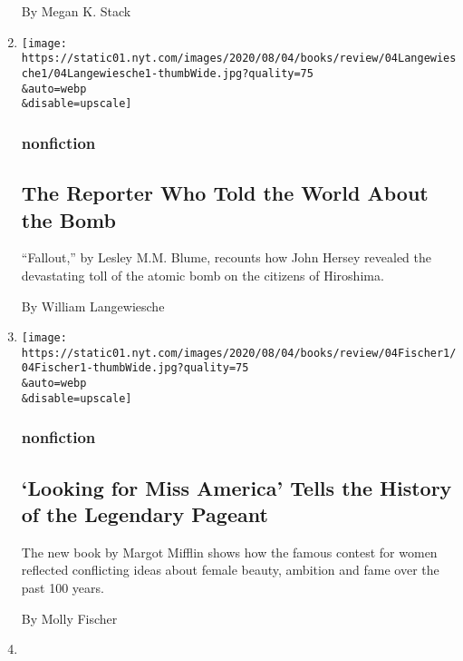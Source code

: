 \begin{enumerate}
  By Megan K. Stack
\item
  \href{/2020/08/04/books/review/fallout-hiroshima-hersey-lesley-m-m-blume.html}{}

  \texttt{[image: https://static01.nyt.com/images/2020/08/04/books/review/04Langewiesche1/04Langewiesche1-thumbWide.jpg?quality=75\\\&auto=webp\\\&disable=upscale]}

  \hypertarget{nonfiction-1}{%
  \subsubsection{nonfiction}\label{nonfiction-1}}

  \hypertarget{the-reporter-who-told-the-world-about-the-bomb}{%
  \subsection{The Reporter Who Told the World About the
  Bomb}\label{the-reporter-who-told-the-world-about-the-bomb}}

  ``Fallout,'' by Lesley M.M. Blume, recounts how John Hersey revealed
  the devastating toll of the atomic bomb on the citizens of Hiroshima.

  By William Langewiesche
\item
  \href{/2020/08/04/books/review/looking-for-miss-america-margot-mifflin.html}{}

  \texttt{[image: https://static01.nyt.com/images/2020/08/04/books/review/04Fischer1/04Fischer1-thumbWide.jpg?quality=75\\\&auto=webp\\\&disable=upscale]}

  \hypertarget{nonfiction-2}{%
  \subsubsection{nonfiction}\label{nonfiction-2}}

  \hypertarget{looking-for-miss-america-tells-the-history-of-the-legendary-pageant}{%
  \subsection{`Looking for Miss America' Tells the History of the
  Legendary
  Pageant}\label{looking-for-miss-america-tells-the-history-of-the-legendary-pageant}}

  The new book by Margot Mifflin shows how the famous contest for women
  reflected conflicting ideas about female beauty, ambition and fame
  over the past 100 years.

  By Molly Fischer
\item
  \href{/2020/08/04/books/review/caste-isabel-wilkerson.html}{}


\end{enumerate}

